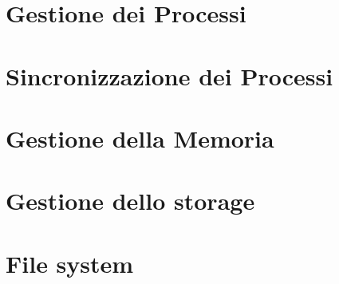\documentclass{book}
\begin{document}



\newpage\tableofcontents

\newpage\listoffigures

\newpage\lstlistoflistings




\lstset{style = C++}





\newpage\part{Gestione dei Processi}











\newpage\part{Sincronizzazione dei Processi}









\newpage\part{Gestione della Memoria}









\newpage\part{Gestione dello storage}









\newpage\part{File system}




\end{document}
